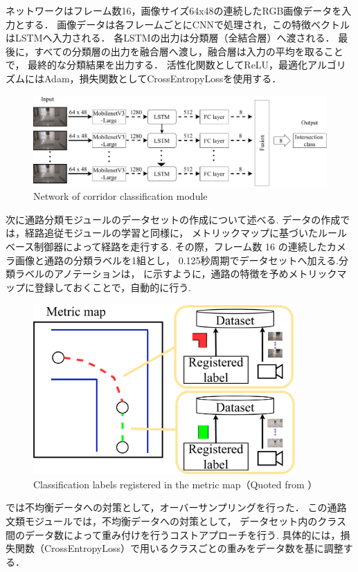 ネットワークはフレーム数16，画像サイズ64x48の連続したRGB画像データを入力とする．
画像データは各フレームごとにCNNで処理され，この特徴ベクトルはLSTMへ入力される．
各LSTMの出力は分類層（全結合層）へ渡される．
最後に，すべての分類層の出力を融合層へ渡し，融合層は入力の平均を取ることで，
最終的な分類結果を出力する．
活性化関数としてReLU，最適化アルゴリズムにはAdam，損失関数としてCrossEntropyLossを使用する．
\begin{figure}[htbp]
    \centering
     \includegraphics[width=120mm]{images/pdf/network-intersect.pdf}
     \caption{Network of corridor classification module}
     \label{fig:int_net}
\end{figure}

\newpage
次に通路分類モジュールのデータセットの作成について述べる.
データの作成では，経路追従モジュールの学習と同様に，
メトリックマップに基づいたルールベース制御器によって経路を走行する.
その際，フレーム数 16 の連続したカメラ画像と通路の分類ラベルを1組とし，
0.125秒周期でデータセットへ加える.分類ラベルのアノテーションは，
に示すように，通路の特徴を予めメトリックマップに登録しておくことで，自動的に行う.
\vspace{3zh}
\begin{figure}[htbp]
    \centering
     \includegraphics[width=100mm]{images/pdf/map_label.pdf}
     \caption[Classification labels registered in the metric map]{Classification labels registered in the metric map（Quoted from \cite{haruyama2023}）}
     \label{fig:int_net}
\end{figure}

では不均衡データへの対策として，オーバーサンプリングを行った．
この通路文類モジュールでは，不均衡データへの対策として，
データセット内のクラス間のデータ数によって重み付けを行うコストアプローチ\cite{cost}を行う.
具体的には，損失関数（CrossEntropyLoss）で用いるクラスごとの重みをデータ数を基に調整する．